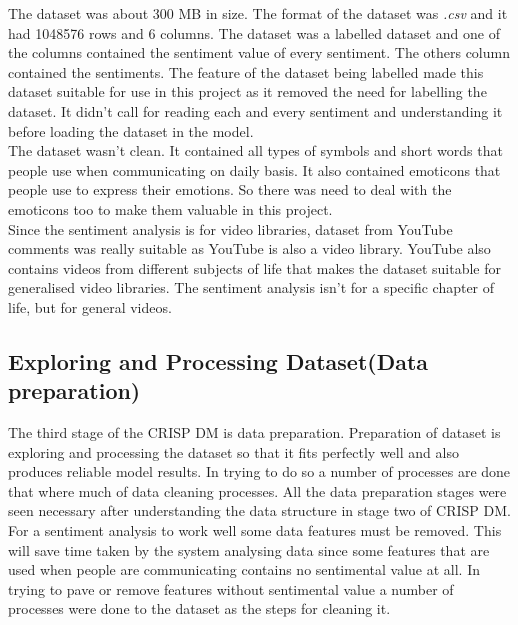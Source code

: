 \documentclass[12pt]{report}
\begin{document}
	The dataset was about 300 MB in size. The format of the dataset was \textit{.csv} and it had 1048576 rows and 6 columns. The dataset was a labelled dataset and one of the columns contained the sentiment value of every sentiment. The others column contained the sentiments. The feature of the dataset being labelled made this dataset suitable for use in this project as it removed the need for labelling the dataset. It didn’t call for reading each and every sentiment and understanding it before loading the dataset in the model.\\
	
	The dataset wasn't clean. It contained all types of symbols and short words that people use when communicating on daily basis. It also contained emoticons that people use to express their emotions. So there was need to deal with the emoticons too to make them valuable in this project.\\
	
	Since the sentiment analysis is for video libraries, dataset from YouTube comments was really suitable as YouTube is also a video library. YouTube also contains videos from different subjects of life that makes the dataset suitable for generalised video libraries. The sentiment analysis isn't for a specific chapter of life, but for general videos.\\
	
		\subsection{Exploring and Processing  Dataset(Data preparation)}
	The third stage of the CRISP DM is data preparation. Preparation of dataset is exploring and processing the dataset so that it fits perfectly well and also produces reliable model results. In trying to do so a number of processes are done that where much of data cleaning processes. All the data preparation stages were seen necessary after understanding the data structure in stage two of CRISP DM.\\
	
	For a sentiment analysis to work well some data features must be removed. This will save time taken by the system analysing data since some features that are used when people are communicating contains no sentimental value at all. In trying to pave or remove features without sentimental value a number of processes were done to the dataset as the steps for cleaning it.\\
	
\end{document}

